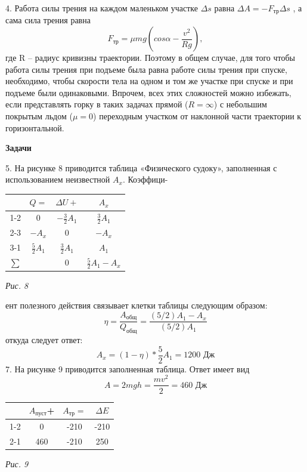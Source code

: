 \begin{multicols}{2}
4. Работа силы трения на каждом маленьком участке
${\Delta}s$
равна
${\Delta}A = -F_{\mbox{тр}}{\Delta}s$
, а сама сила трения равна\\
\[ F_{\mbox{тр}} = {\mu}mg(cos {\alpha} - \frac{v^2}{Rg}),\]
где R – радиус кривизны траектории. Поэтому в общем случае, для того чтобы работа силы трения при подъеме была
равна работе силы трения при спуске, необходимо, чтобы
скорости тела на одном и том же участке при спуске и при
подъеме были одинаковыми. Впрочем, всех этих сложностей
можно избежать, если представлять горку в таких задачах
прямой ($R = \infty$) с небольшим покрытым льдом ($\mu = 0$) переходным участком от наклонной части траектории к горизонтальной.

{\centering\textbf{\mbox{Задачи}}\par}

5. На рисунке 8 приводится таблица «Физического судоку»,
заполненная с использованием неизвестной $A_x$.
Коэффици-

{\centering
\begin{tabular}{| c | c | c | c |}
    \hline
     & $Q=$ & ${\Delta}U+$ & $A_x$ \\ 
    \hline
    1-2 & $0$ & $-\frac{3}{2}A_1$ & $\frac{3}{2}A_1$\\  
    \hline
    2-3 & $-A_x$ & $0$ & $-A_x$\\
    \hline
    3-1 & $\frac{5}{2}A_1$ & $\frac{3}{2}A_1$ & $A_1$\\
    \hline
    ${\sum}$ & & 0 & $\frac{5}{2}A_1 - A_x$\\
    \hline
\end{tabular}
\par}
\hspace{2.1cm}\textit{Рис. 8}

ент полезного действия связывает клетки таблицы следующим
образом:
\[\eta = \frac{A_{\mbox{общ}}}{Q_{\mbox{общ}}} = \frac{(5/2)A_1-A_x}{(5/2)A_1}\]
откуда следует ответ:
\[ A_x = (1-\eta)*\frac{5}{2}A_1=1200\mbox{ Дж} \]
7. На рисунке 9 приводится заполненная таблица. Ответ имеет вид
\[ A = 2mgh = \frac{mv^2}{2} = 460\mbox{ Дж} \]
{\centering
    \begin{tabular}{ | c | c | c | c | }
        \hline
         & $A_{\mbox{пуст}}$+ & $A_{\mbox{тр}}=$ & ${\Delta}E$ \\
        \hline
        1-2 & 0 & -210 & -210 \\
        \hline
        2-1 & 460 & -210 & 250 \\
        \hline
    \end{tabular}
\par}
\hspace{2.1cm}\textit{Рис. 9}


\end{multicols}

